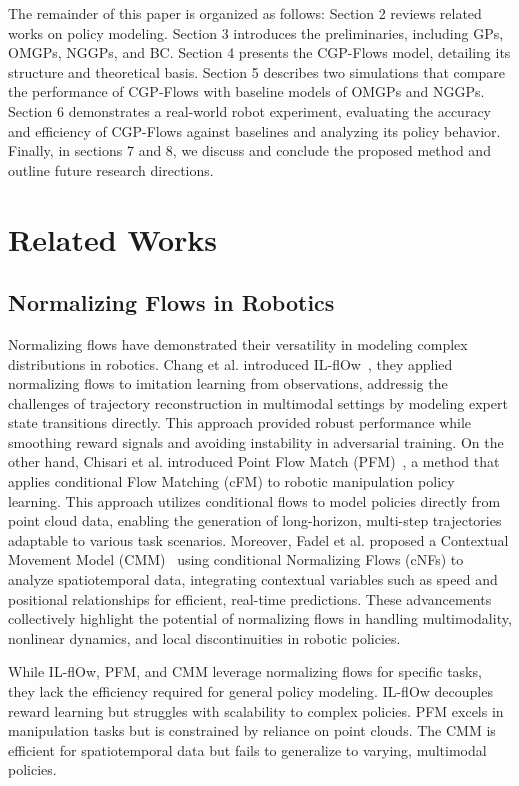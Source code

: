 \documentclass[sn-mathphys-num]{sn-jnl}
\begin{document}
The remainder of this paper is organized as follows:
Section 2 reviews related works on policy modeling.
Section 3 introduces the preliminaries, including GPs, OMGPs, NGGPs, and BC.
Section 4 presents the CGP-Flows model, detailing its structure and theoretical basis.
Section 5 describes two simulations that compare the performance of CGP-Flows with baseline models of OMGPs and NGGPs.
Section 6 demonstrates a real-world robot experiment, evaluating the accuracy and efficiency of CGP-Flows against baselines and analyzing its policy behavior.
Finally, in sections 7 and 8, we discuss and conclude the proposed method and outline future research directions.



\section{Related Works}\label{section 2}
\subsection{Normalizing Flows in Robotics}

Normalizing flows have demonstrated their versatility in modeling complex distributions in robotics.
Chang et al. introduced IL-flOw~\cite{chang2021ilflow}, they applied normalizing flows to imitation learning from observations, addressig the challenges of trajectory reconstruction in multimodal settings by modeling expert state transitions directly.
This approach provided robust performance while smoothing reward signals and avoiding instability in adversarial training.
On the other hand, Chisari et al. introduced Point Flow Match (PFM)~\cite{chisari2024learning}, a method that applies conditional Flow Matching (cFM) to robotic manipulation policy learning. This approach utilizes conditional flows to model policies directly from point cloud data, enabling the generation of long-horizon, multi-step trajectories adaptable to various task scenarios.
Moreover, Fadel et al. proposed a Contextual Movement Model (CMM)~\cite{fadel2023contextual} using conditional Normalizing Flows (cNFs) to analyze spatiotemporal data, integrating contextual variables such as speed and positional relationships for efficient, real-time predictions. These advancements collectively highlight the potential of normalizing flows in handling multimodality, nonlinear dynamics, and local discontinuities in robotic policies.

While IL-flOw, PFM, and CMM leverage normalizing flows for specific tasks, they lack the efficiency required for general policy modeling. IL-flOw decouples reward learning but struggles with scalability to complex policies. PFM excels in manipulation tasks but is constrained by reliance on point clouds. The CMM is efficient for spatiotemporal data but fails to generalize to varying, multimodal policies. 
\end{document}
